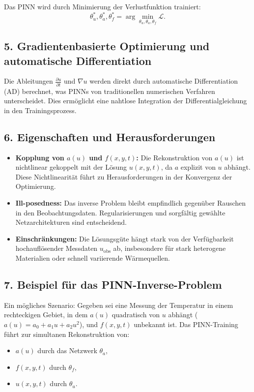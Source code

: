 Das PINN wird durch Minimierung der Verlustfunktion trainiert:
\[
\theta_u^*, \theta_a^*, \theta_f^* = \arg \min_{\theta_u, \theta_a, \theta_f} \mathcal{L}.
\]

\subsection*{5. Gradientenbasierte Optimierung und automatische Differentiation}

Die Ableitungen \(\frac{\partial u}{\partial t}\) und \(\nabla u\) werden direkt durch automatische Differentiation (AD) berechnet, was PINNs von traditionellen numerischen Verfahren unterscheidet. Dies ermöglicht eine nahtlose Integration der Differentialgleichung in den Trainingsprozess.

\subsection*{6. Eigenschaften und Herausforderungen}

\begin{itemize}
	\item \textbf{Kopplung von \(a(u)\) und \(f(x, y, t)\):}  
	Die Rekonstruktion von \(a(u)\) ist nichtlinear gekoppelt mit der Lösung \(u(x, y, t)\), da \(a\) explizit von \(u\) abhängt. Diese Nichtlinearität führt zu Herausforderungen in der Konvergenz der Optimierung.
	\item \textbf{Ill-posedness:}  
	Das inverse Problem bleibt empfindlich gegenüber Rauschen in den Beobachtungsdaten. Regularisierungen und sorgfältig gewählte Netzarchitekturen sind entscheidend.
	\item \textbf{Einschränkungen:}  
	Die Lösungsgüte hängt stark von der Verfügbarkeit hochauflösender Messdaten \(u_\text{obs}\) ab, insbesondere für stark heterogene Materialien oder schnell variierende Wärmequellen.
\end{itemize}

\subsection*{7. Beispiel für das PINN-Inverse-Problem}

Ein mögliches Szenario: Gegeben sei eine Messung der Temperatur in einem rechteckigen Gebiet, in dem \(a(u)\) quadratisch von \(u\) abhängt (\(a(u) = a_0 + a_1 u + a_2 u^2\)), und \(f(x, y, t)\) unbekannt ist. Das PINN-Training führt zur simultanen Rekonstruktion von:
\begin{itemize}
	\item \(a(u)\) durch das Netzwerk \(\theta_a\),
	\item \(f(x, y, t)\) durch \(\theta_f\),
	\item \(u(x, y, t)\) durch \(\theta_u\).
\end{itemize}

